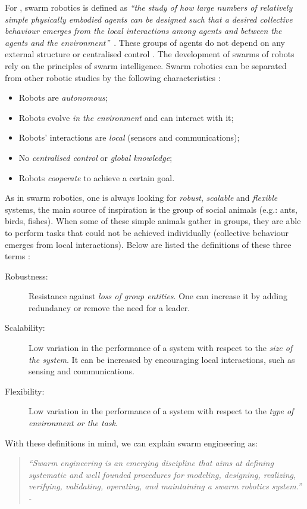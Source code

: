\documentclass[oneside, a4paper, 12pt]{memoir}
\newcommand{\quoto}[2]{
\begin{quotation}
\textit{\enquote{#1} - #2}
\end{quotation}
}
\newcommand{\quot}[1]{\textit{\enquote{#1}}}
\begin{document}
			For \citet{csahin2005swarm}, swarm robotics is defined as \quot{the study of how large numbers of relatively simple physically embodied agents can be designed such that a desired collective behaviour emerges from the local interactions among agents and between the agents and the environment}~\citep{csahin2005swarm}. These groups of agents do not depend on any external structure or centralised control \citep{Dorigo:2014}. The development of swarms of robots rely on the principles of swarm intelligence. Swarm robotics can be separated from other robotic studies by the following characteristics \citep{brambilla2013swarm}:
%
		\begin{itemize}
			\item Robots are \emph{autonomous};
			\item Robots evolve \emph{in the environment} and can interact with it;
			\item Robots' interactions are \emph{local} (sensors and communications);
			\item No \emph{centralised control} or \emph{global knowledge};
			\item Robots \emph{cooperate} to achieve a certain goal.
			\end{itemize}%
%
			As in swarm robotics, one is always looking for \emph{robust}, \emph{scalable} and \emph{flexible} systems, the main source of inspiration is the group of social animals (e.g.: ants, birds, fishes). When some of these simple animals gather in groups, they are able to perform tasks that could not be achieved individually (collective behaviour emerges from local interactions). Below are listed the definitions of these three terms \citep{brambilla2013swarm}:
			\label{def:robustness_scalability_flexibility}%
%
			\begin{description}
			\item[Robustness:] Resistance against \emph{loss of group entities}. One can increase it by adding redundancy or remove the need for a leader.
			\item[Scalability:] Low variation in the performance of a system with respect to the \emph{size of the system}. It can be increased by encouraging local interactions, such as sensing and communications.
			\item[Flexibility:] Low variation in the performance of a system with respect to the \emph{type of environment or the task}.
		\end{description}%
%
		With these definitions in mind, we can explain swarm engineering as:
		\quoto{Swarm engineering is an emerging discipline that aims at defining systematic and well founded procedures for modeling, designing, realizing, verifying, validating, operating, and maintaining a swarm robotics system.}{\cite{brambilla2013swarm}}
%
		
\end{document}
